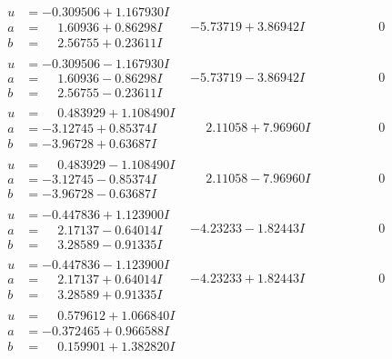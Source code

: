 \documentclass[1p]{elsarticle_modified}
\theoremstyle{definition}
\begin{document}
$$\begin{array}{c|c|c}
\begin{aligned}
u &= -0.309506 + 1.167930 I \\
a &= \phantom{-}1.60936 + 0.86298 I \\
b &= \phantom{-}2.56755 + 0.23611 I\end{aligned}
 & -5.73719 + 3.86942 I & \phantom{-0.000000 } 0 \\ \hline\begin{aligned}
u &= -0.309506 - 1.167930 I \\
a &= \phantom{-}1.60936 - 0.86298 I \\
b &= \phantom{-}2.56755 - 0.23611 I\end{aligned}
 & -5.73719 - 3.86942 I & \phantom{-0.000000 } 0 \\ \hline\begin{aligned}
u &= \phantom{-}0.483929 + 1.108490 I \\
a &= -3.12745 + 0.85374 I \\
b &= -3.96728 + 0.63687 I\end{aligned}
 & \phantom{-}2.11058 + 7.96960 I & \phantom{-0.000000 } 0 \\ \hline\begin{aligned}
u &= \phantom{-}0.483929 - 1.108490 I \\
a &= -3.12745 - 0.85374 I \\
b &= -3.96728 - 0.63687 I\end{aligned}
 & \phantom{-}2.11058 - 7.96960 I & \phantom{-0.000000 } 0 \\ \hline\begin{aligned}
u &= -0.447836 + 1.123900 I \\
a &= \phantom{-}2.17137 - 0.64014 I \\
b &= \phantom{-}3.28589 - 0.91335 I\end{aligned}
 & -4.23233 - 1.82443 I & \phantom{-0.000000 } 0 \\ \hline\begin{aligned}
u &= -0.447836 - 1.123900 I \\
a &= \phantom{-}2.17137 + 0.64014 I \\
b &= \phantom{-}3.28589 + 0.91335 I\end{aligned}
 & -4.23233 + 1.82443 I & \phantom{-0.000000 } 0 \\ \hline\begin{aligned}
u &= \phantom{-}0.579612 + 1.066840 I \\
a &= -0.372465 + 0.966588 I \\
b &= \phantom{-}0.159901 + 1.382820 I\end{aligned}

\end{array}$$
\end{document}
